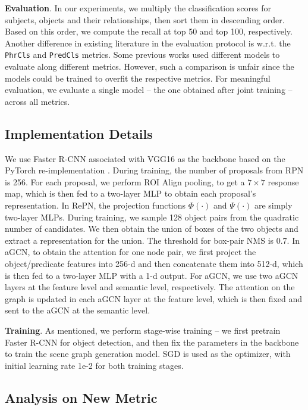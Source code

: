 \textbf{Evaluation}. 
In our experiments, we multiply the classification scores for subjects, objects and their relationships, then sort them in descending order. Based on this order, we compute the recall at top 50 and top 100, respectively. Another difference in existing literature in the evaluation protocol is w.r.t. the \texttt{PhrCls} and \texttt{PredCls} metrics. Some previous works \cite{li2017scene,newell2017pixels} used different models to evaluate along different metrics. However, such a comparison is unfair since the models could be trained to overfit the respective metrics. For meaningful evaluation, we evaluate a single model -- the one obtained after joint training -- across all metrics. 

\subsection{Implementation Details}
We use Faster R-CNN \cite{ren2015faster} associated with VGG16 \cite{simonyan2014very} as the backbone based on the PyTorch re-implementation \cite{jjfaster2rcnn}. During training, the number of proposals from RPN is 256. For each proposal, we perform ROI Align \cite{he2017mask} pooling, to get a $7 \times 7$ response map, which is then fed to a two-layer MLP to obtain each proposal's representation. In RePN, the projection functions $\Phi(\cdot)$ and $\Psi(\cdot)$ are simply two-layer MLPs. During training, we sample 128 object pairs from the quadratic number of candidates. We then obtain the union of boxes of the two objects and extract a representation for the union. The threshold for box-pair NMS is 0.7. In aGCN, to obtain the attention for one node pair, we first project the object/predicate features into 256-d and then concatenate them into 512-d, which is then fed to a two-layer MLP with a 1-d output. For aGCN, we use two aGCN layers at the feature level and semantic level, respectively. The attention on the graph is updated in each aGCN layer at the feature level, which is then fixed and sent to the aGCN at the semantic level.

\textbf{Training}. As mentioned, we perform stage-wise training -- we first pretrain Faster R-CNN for object detection, and then fix the parameters in the backbone to train the scene graph generation model. SGD is used as the optimizer, with initial learning rate 1e-2 for both training stages. 

\subsection{Analysis on New Metric}

